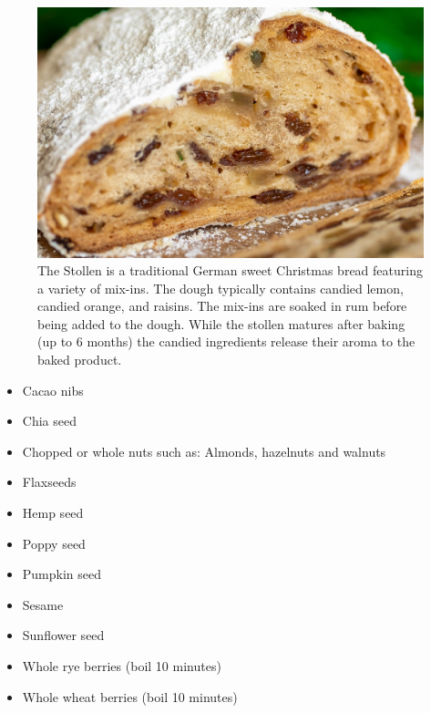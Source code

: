 \begin{figure}[htb!]
  \centering
  \includegraphics[width=\textwidth]{stollen-close-up}
  \caption[Stollen closeup]{The Stollen is a traditional German sweet Christmas
    bread featuring a variety of mix-ins. The dough typically contains candied
    lemon, candied orange, and raisins. The mix-ins are soaked in rum before
    being added to the dough. While the stollen matures after baking (up to
    \num{6} months) the candied ingredients release their aroma to the baked
    product.}%
\end{figure}

\begin{itemize}
  \item Cacao nibs
  \item Chia seed
  \item Chopped or whole nuts such as: Almonds, hazelnuts and walnuts
  \item Flaxseeds
  \item Hemp seed
  \item Poppy seed
  \item Pumpkin seed
  \item Sesame
  \item Sunflower seed
  \item Whole rye berries (boil 10 minutes)
  \item Whole wheat berries (boil 10 minutes)
\end{itemize}


